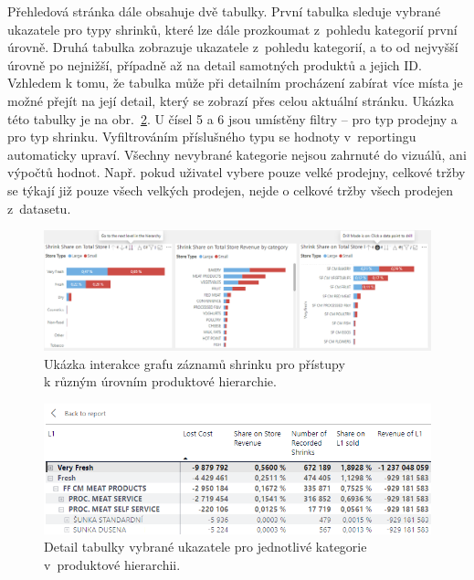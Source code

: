 Přehledová stránka dále obsahuje dvě tabulky. První tabulka sleduje vybrané ukazatele pro typy shrinků, které lze dále prozkoumat z~pohledu kategorií první úrovně. Druhá tabulka zobrazuje ukazatele z~pohledu kategorií, a to od nejvyšší úrovně po nejnižší, případně až na detail samotných produktů a jejich ID. Vzhledem k tomu, že tabulka může při detailním procházení zabírat více místa je možné přejít na její detail, který se zobrazí přes celou aktuální stránku. Ukázka této tabulky je na obr.~\ref*{obr:PBI:tab1}.
U čísel 5 a 6 jsou umístěny filtry -- pro typ prodejny a pro typ shrinku. Vyfiltrováním příslušného typu se hodnoty v~reportingu automaticky upraví. Všechny nevybrané kategorie nejsou zahrnuté do vizuálů, ani výpočtů hodnot. Např. pokud uživatel vybere pouze velké prodejny, celkové tržby se týkají již pouze všech velkých prodejen, nejde o celkové tržby všech prodejen z~datasetu.

\begin{figure}[h!]
    \centering
    \captionsetup{justification=centering}
    \includegraphics[width=\textwidth]{obrazky/PBI/Catdrilldown.png}
    \caption{Ukázka interakce grafu záznamů shrinku pro přístupy \\ k různým úrovním produktové hierarchie.}
    \label{obr:PBI:drill}
\end{figure}

\begin{figure}[h!]
    \centering
    \captionsetup{justification=centering}
    \includegraphics[width=\textwidth]{obrazky/PBI/tabulkaukzka.png}
    \caption{Detail tabulky vybrané ukazatele pro jednotlivé kategorie \\ v~produktové hierarchii.}
    \label{obr:PBI:tab1}
\end{figure}

